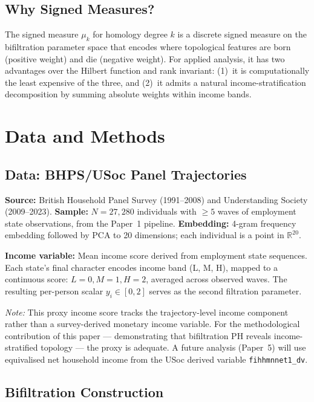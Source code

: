 \subsection{Why Signed Measures?}

The signed measure $\mu_k$ for homology degree $k$ is a discrete signed
measure on the bifiltration parameter space that encodes where topological
features are born (positive weight) and die (negative weight). For applied
analysis, it has two advantages over the Hilbert function and rank invariant:
(1)~it is computationally the least expensive of the three, and (2)~it
admits a natural income-stratification decomposition by summing absolute
weights within income bands.

\section{Data and Methods}
\label{sec:methods}

\subsection{Data: BHPS/USoc Panel Trajectories}

\textbf{Source:} British Household Panel Survey (1991--2008) and
Understanding Society (2009--2023). \textbf{Sample:} $N = 27{,}280$
individuals with $\geq 5$ waves of employment state observations, from the
Paper~1 pipeline. \textbf{Embedding:} 4-gram frequency embedding followed by
PCA to 20 dimensions; each individual is a point in $\mathbb{R}^{20}$.

\textbf{Income variable:} Mean income score derived from employment state
sequences. Each state's final character encodes income band (L, M, H),
mapped to a continuous score: $L = 0, M = 1, H = 2$, averaged across
observed waves. The resulting per-person scalar $y_i \in [0, 2]$ serves as
the second filtration parameter.

\textit{Note:} This proxy income score tracks the trajectory-level income
component rather than a survey-derived monetary income variable. For the
methodological contribution of this paper --- demonstrating that bifiltration
PH reveals income-stratified topology --- the proxy is adequate. A future
analysis (Paper~5) will use equivalised net household income from the USoc
derived variable \texttt{fihhmnnet1\_dv}.

\subsection{Bifiltration Construction}

